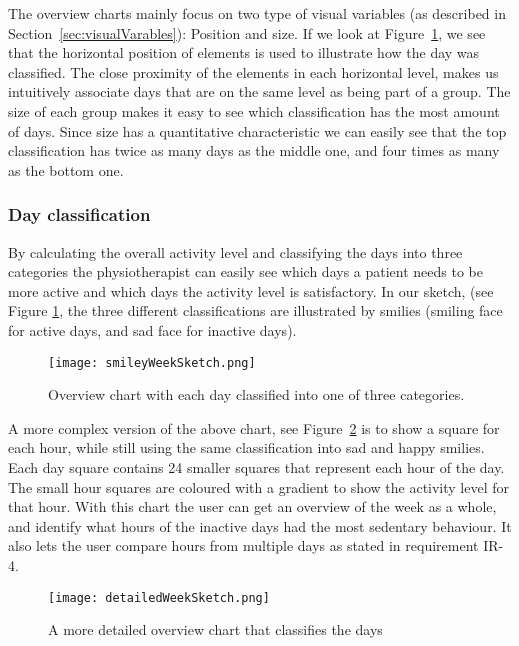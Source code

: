 The overview charts mainly focus on two type of visual variables (as described in Section~\ref{sec:visualVarables}): Position and size. If we look at Figure~\ref{fig:smileyWeek}, we see that the horizontal position of elements is used to illustrate how the day was classified. The close proximity of the elements in each horizontal level, makes us intuitively associate days that are on the same level as being part of a group. The size of each group makes it easy to see which classification has the most amount of days. Since size has a quantitative characteristic we can easily see that the top classification has twice as many days as the middle one, and four times as many as the bottom one.

\subsubsection{Day classification}
By calculating the overall activity level and classifying the days into three categories the physiotherapist can easily see which days a patient needs to be more active and which days the activity level is satisfactory. In our sketch, (see Figure \ref{fig:smileyWeek}, the three different classifications are illustrated by smilies (smiling face for active days, and sad face for inactive days).

\begin{figure}[h!]
	\centering
		\texttt{[image: smileyWeekSketch.png]}
		\caption{\footnotesize Overview chart with each day classified into one of three categories.}
		\label{fig:smileyWeek}
\end{figure}

A more complex version of the above chart, see Figure~\ref{fig:detailedWeek} is to show a square for each hour, while still using the same classification into sad and happy smilies. Each day square contains 24 smaller squares that represent each hour of the day. The small hour squares are coloured with a gradient to show the activity level for that hour. With this chart the user can get an overview of the week as a whole, and identify what hours of the inactive days had the most sedentary behaviour. It also lets the user compare hours from multiple days as stated in requirement IR-4.

\begin{figure}[h!]
	\centering
		\texttt{[image: detailedWeekSketch.png]}
		\caption{\footnotesize A more detailed overview chart that classifies the days}
		\label{fig:detailedWeek}
\end{figure}

